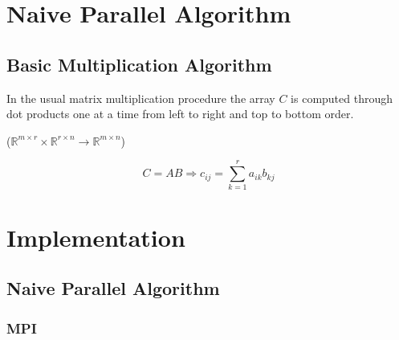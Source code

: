 \section{Naive Parallel Algorithm}

\subsection{Basic Multiplication Algorithm}

In the usual matrix multiplication procedure the array $C$ is computed
through dot products one at a time from left to right and top to
bottom order.

 ($\mathbb{R}^{m \times r} \times
\mathbb{R}^{r \times n} \to \mathbb{R}^{m \times n}$)

$$ C = AB \Longrightarrow c_{ij} = \sum_{k=1}^r a_{ik}b_{kj} $$




\section{Implementation}

\subsection{Naive Parallel Algorithm}




\subsubsection{MPI}

